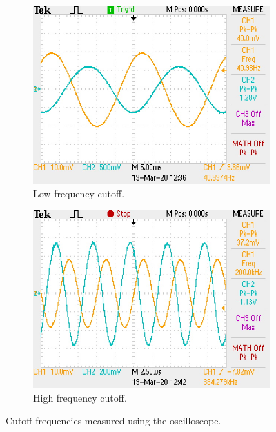 \documentclass{report}
\begin{document}
\begin{figure}[H]
	\centering
	\begin{subfigure}{0.4\linewidth}
		\centering
		\includegraphics[width=\linewidth]{exp1fl}
		\caption{Low frequency cutoff.}
		\label{fig:exp1fl}
	\end{subfigure}
	\hfill
	\begin{subfigure}{0.4\linewidth}
		\centering
		\includegraphics[width=\linewidth]{exp1fh}
		\caption{High frequency cutoff.}
		\label{fig:exp1fh}
	\end{subfigure}
	\caption{Cutoff frequencies measured using the oscilloscope.}
	\label{fig:exp1f}
\end{figure}
\vspace{-2em}
\end{document}
